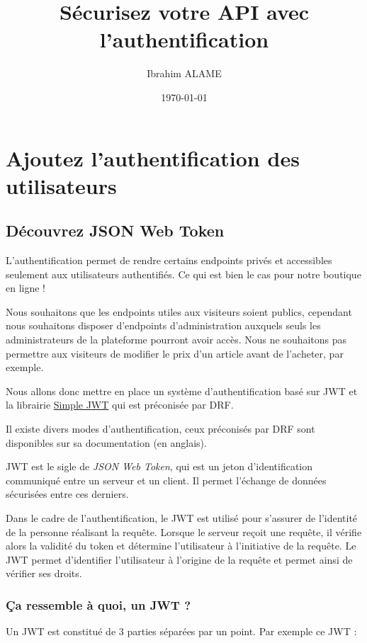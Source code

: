 \documentclass[a4paper]{article}
\title{Sécurisez votre API avec l’authentification}
\author{Ibrahim ALAME}
\date{\today}
\begin{document}
 
\maketitle
\section{Ajoutez l’authentification des utilisateurs}
\subsection{Découvrez JSON Web Token}
L’authentification permet de rendre certains endpoints {\color{monOrange}privés} et accessibles seulement aux utilisateurs authentifiés. Ce qui est bien le cas pour notre boutique en ligne !

Nous souhaitons que les endpoints utiles aux visiteurs soient publics, cependant nous souhaitons disposer d'{\color{monOrange}endpoints d’administration} auxquels seuls les administrateurs de la plateforme pourront avoir accès. Nous ne souhaitons pas permettre aux visiteurs de modifier le prix d’un article avant de l’acheter, par exemple.

Nous allons donc mettre en place un système d’authentification basé sur JWT et la librairie \href{https://www.django-rest-framework.org/api-guide/authentication/\#json-web-token-authentication}{Simple JWT} qui est préconisée par DRF.
\begin{theorem}
Il existe divers modes d'authentification, ceux préconisés par DRF sont disponibles sur sa {\color{monOrange}documentation} (en anglais).
\end{theorem}
JWT est le sigle de {\em JSON Web Token}, qui est un {\color{monOrange}jeton d’identification} communiqué entre un serveur et un client. Il permet l’échange de données sécurisées entre ces derniers.

Dans le cadre de l’authentification, le JWT est utilisé pour s’assurer de l’identité de la personne réalisant la requête. Lorsque le serveur reçoit une requête, il vérifie alors la validité du token et détermine l’utilisateur à l’initiative de la requête. Le JWT permet d’identifier l’{\color{monOrange}utilisateur} à l’origine de la requête et permet ainsi de {\color{monOrange}vérifier ses droits}.

\subsubsection*{Ça ressemble à quoi, un JWT ?}
Un JWT est constitué de 3 parties séparées par un point. Par exemple ce JWT : 
\end{document}
